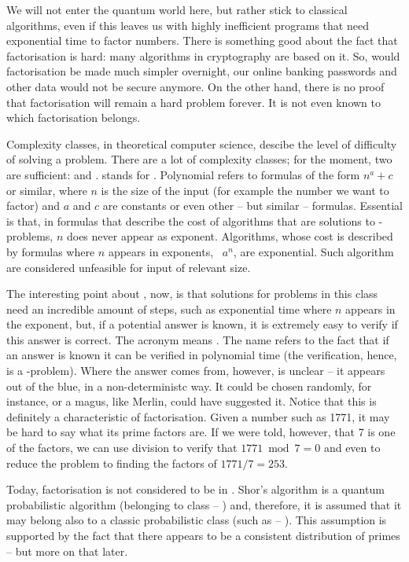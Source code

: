 \documentclass{scrreprt}
\begin{document}
We will not enter the quantum world here,
but rather stick to classical algorithms,
even if this leaves us with highly inefficient programs
that need exponential time to factor numbers.
There is something good about the fact
that factorisation is hard:
many algorithms in cryptography are based on it.
So, would factorisation be made much simpler overnight,
our online banking passwords and other data would not be
secure anymore.
On the other hand, there is no proof that factorisation
will remain a hard problem forever.
It is not even known to which 
factorisation belongs.

Complexity classes, in theoretical computer science,
descibe the level of difficulty of solving a problem.
There are a lot of complexity classes; for the moment,
two are sufficient:  and .
 stands for .
Polynomial refers to formulas of the form
$n^a + c$ or similar, where $n$ is the size of the input
(for example the number we want to factor) and $a$ and $c$ are constants
or even other -- but similar -- formulas.
Essential is that, in formulas that describe the cost 
of algorithms that are solutions to -problems,
$n$ does never appear as exponent. 
Algorithms, whose cost is described by formulas
where $n$ appears in exponents, \eg\ $a^n$, are exponential.
Such algorithm are considered unfeasible for input
of relevant size.

The interesting point about , now, is 
that solutions for problems in this class need an incredible amount
of steps, such as exponential time where $n$ appears in the exponent,
but, if a potential answer is known, it is extremely easy
to verify if this answer is correct.
The acronym  means .
The name refers to the fact that if an answer is known
it can be verified in polynomial time (the verification, hence,
is a -problem). Where the answer comes from, however,
is unclear -- it appears out of the blue, 
in a non-deterministc way. It could be chosen randomly, for instance,
or a magus, like Merlin, could have suggested it.
Notice that this is definitely a characteristic
of factorisation. Given a number such as \num{1771},
it may be hard to say what its prime factors are.
If we were told, however, that 7 is one of the factors,
we can use division to verify that $1771 \bmod{7} = 0$
and even to reduce
the problem to finding the factors of $1771 / 7 = 253$.

Today, factorisation is not considered to be in .
Shor's algorithm is a quantum probabilistic algorithm 
(belonging to class  -- 
)
and, therefore, it is assumed that it may belong also 
to a classic probabilistic class (such as  --
).
This assumption is supported by the fact
that there appears to be a consistent distribution of primes --
but more on that later.
\end{document}
